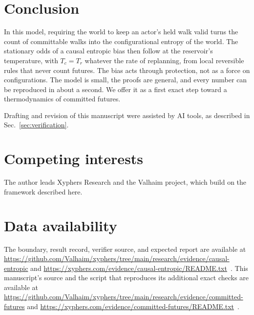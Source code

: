 \documentclass[aps,pre,preprint,superscriptaddress,nofootinbib]{revtex4-2}
\theoremstyle{definition}
\theoremstyle{remark}
\begin{document}
\section{Conclusion}

In this model, requiring the world to keep an actor's held walk valid turns the count of committable walks into the configurational entropy of the world. The stationary odds of a causal entropic bias then follow at the reservoir's temperature, with $T_c=T_r$ whatever the rate of replanning, from local reversible rules that never count futures. The bias acts through protection, not as a force on configurations. The model is small, the proofs are general, and every number can be reproduced in about a second. We offer it as a first exact step toward a thermodynamics of committed futures.

\begin{acknowledgments}
Drafting and revision of this manuscript were assisted by AI tools, as described in Sec.~\ref{sec:verification}.
\end{acknowledgments}

\section*{Competing interests}
The author leads Xyphers Research and the Valhaim project, which build on the framework described here.

\section*{Data availability}
The boundary, result record, verifier source, and expected report are available at \url{https://github.com/Valhaim/xyphers/tree/main/research/evidence/causal-entropic} and \url{https://xyphers.com/evidence/causal-entropic/README.txt}~\cite{CALCEF}. This manuscript's source and the script that reproduces its additional exact checks are available at \url{https://github.com/Valhaim/xyphers/tree/main/research/evidence/committed-futures} and \url{https://xyphers.com/evidence/committed-futures/README.txt}~\cite{CFPACKET}.


\end{document}
